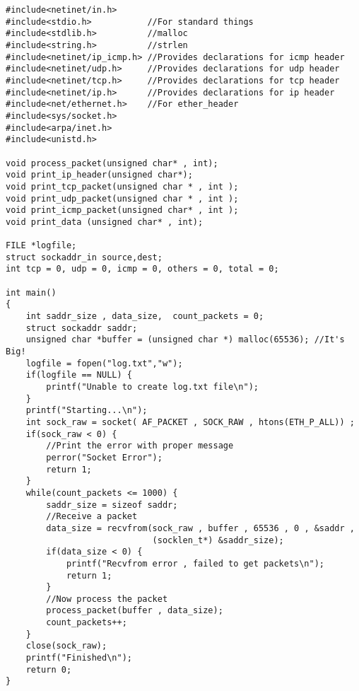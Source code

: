 \footnotesize
\begin{verbatim}
#include<netinet/in.h>
#include<stdio.h>           //For standard things
#include<stdlib.h>          //malloc
#include<string.h>          //strlen
#include<netinet/ip_icmp.h> //Provides declarations for icmp header
#include<netinet/udp.h>     //Provides declarations for udp header
#include<netinet/tcp.h>     //Provides declarations for tcp header
#include<netinet/ip.h>      //Provides declarations for ip header
#include<net/ethernet.h>    //For ether_header
#include<sys/socket.h>
#include<arpa/inet.h>
#include<unistd.h>

void process_packet(unsigned char* , int);
void print_ip_header(unsigned char*);
void print_tcp_packet(unsigned char * , int );
void print_udp_packet(unsigned char * , int );
void print_icmp_packet(unsigned char* , int );
void print_data (unsigned char* , int);

FILE *logfile;
struct sockaddr_in source,dest;
int tcp = 0, udp = 0, icmp = 0, others = 0, total = 0;

int main()
{
    int saddr_size , data_size,  count_packets = 0;
    struct sockaddr saddr;
    unsigned char *buffer = (unsigned char *) malloc(65536); //It's Big!
    logfile = fopen("log.txt","w");
    if(logfile == NULL) {
        printf("Unable to create log.txt file\n");
    }
    printf("Starting...\n");
    int sock_raw = socket( AF_PACKET , SOCK_RAW , htons(ETH_P_ALL)) ;
    if(sock_raw < 0) {
        //Print the error with proper message
        perror("Socket Error");
        return 1;
    }
    while(count_packets <= 1000) {
        saddr_size = sizeof saddr;
        //Receive a packet
        data_size = recvfrom(sock_raw , buffer , 65536 , 0 , &saddr ,
                             (socklen_t*) &saddr_size);
        if(data_size < 0) {
            printf("Recvfrom error , failed to get packets\n");
            return 1;
        }
        //Now process the packet
        process_packet(buffer , data_size);
        count_packets++;
    }
    close(sock_raw);
    printf("Finished\n");
    return 0;
}


\end{verbatim}
